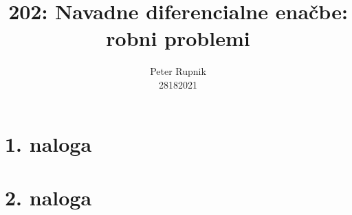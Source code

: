 \documentclass[a4paper,oneside,12pt]{article}
\title{202: Navadne diferencialne enačbe: robni problemi}
\author{Peter Rupnik\\28182021}
\begin{document}
\maketitle

\section{1. naloga}

\clearpage
\section{2. naloga}

\end{document}

